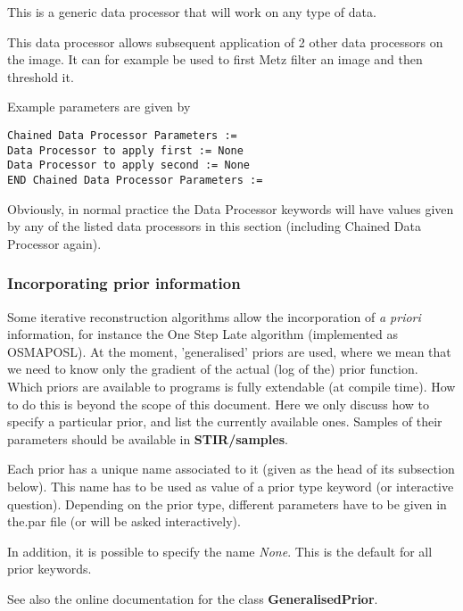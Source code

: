 \documentclass{article}
\begin{document}
{ 
}
This is a generic data processor that will work on any type of data.

This data processor allows subsequent application of 2 other 
data processors on the image. It can for example be used to 
first Metz filter an image and then threshold it.

{ 
}

Example parameters are given by

\begin{verbatim}
Chained Data Processor Parameters :=
Data Processor to apply first := None
Data Processor to apply second := None
END Chained Data Processor Parameters :=
\end{verbatim}

Obviously, in normal practice the Data Processor keywords will 
have values given by any of the listed data processors in this 
section (including Chained Data Processor again).



\subsubsection{
Incorporating prior information}
\label{sec:priors}
Some iterative reconstruction algorithms allow the incorporation 
of \textit{a priori} information, for instance the One Step Late algorithm 
(implemented as OSMAPOSL). At the moment, 'generalised' priors 
are used, where we mean that we need to know only the gradient 
of the actual (log of the) prior function.\\
Which priors are available to programs is fully extendable (at 
compile time). How to do this is beyond the scope of this document. 
Here we only discuss how to specify a particular prior, and list 
the currently available ones. Samples of their parameters should 
be available in \textbf{STIR/samples}.



Each prior has a unique name associated to it (given as the head 
of its subsection below). This name has to be used as value of 
a prior type keyword (or interactive question). Depending on 
the prior type, different parameters have to be given in the.par 
file (or will be asked interactively).


In addition, it is possible to specify the name \textit{None}. This 
is the default for all prior keywords.


See also the online documentation for the class \textbf{GeneralisedPrior}.
\end{document}
